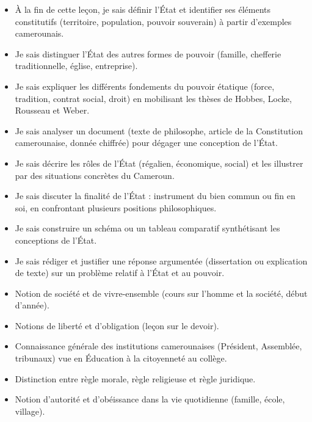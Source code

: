 \documentclass[11pt]{article}
\begin{document}
\begin{objectifs}
\begin{itemize}
\item À la fin de cette leçon, je sais définir l'État et identifier ses éléments constitutifs (territoire, population, pouvoir souverain) à partir d'exemples camerounais.
\item Je sais distinguer l'État des autres formes de pouvoir (famille, chefferie traditionnelle, église, entreprise).
\item Je sais expliquer les différents fondements du pouvoir étatique (force, tradition, contrat social, droit) en mobilisant les thèses de Hobbes, Locke, Rousseau et Weber.
\item Je sais analyser un document (texte de philosophe, article de la Constitution camerounaise, donnée chiffrée) pour dégager une conception de l'État.
\item Je sais décrire les rôles de l'État (régalien, économique, social) et les illustrer par des situations concrètes du Cameroun.
\item Je sais discuter la finalité de l'État : instrument du bien commun ou fin en soi, en confrontant plusieurs positions philosophiques.
\item Je sais construire un schéma ou un tableau comparatif synthétisant les conceptions de l'État.
\item Je sais rédiger et justifier une réponse argumentée (dissertation ou explication de texte) sur un problème relatif à l'État et au pouvoir.
\end{itemize}
\end{objectifs}

\begin{prerequis}
\begin{itemize}
\item Notion de société et de vivre-ensemble (cours sur l'homme et la société, début d'année).
\item Notions de liberté et d'obligation (leçon sur le devoir).
\item Connaissance générale des institutions camerounaises (Président, Assemblée, tribunaux) vue en Éducation à la citoyenneté au collège.
\item Distinction entre règle morale, règle religieuse et règle juridique.
\item Notion d'autorité et d'obéissance dans la vie quotidienne (famille, école, village).
\end{itemize}
\end{prerequis}
\end{document}
